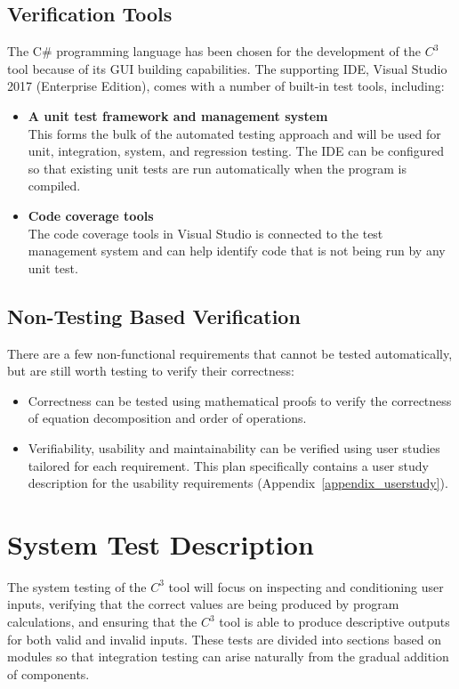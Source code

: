 \documentclass[12pt, titlepage]{article}
\newcommand{\prognameAbbrv}{$C^{3}$}
\begin{document}
\subsection{Verification Tools}
The C\# programming language has been chosen for the development of the 
\prognameAbbrv{} tool because of its GUI building capabilities. The supporting 
IDE, Visual Studio 2017 (Enterprise Edition), comes with a number of built-in 
test tools, including:

\begin{itemize}
	\item \textbf{A unit test framework and management system}\\
	This forms the bulk of the automated testing approach and will be used for 
	unit, integration, system, and regression testing. The IDE can be 
	configured so that existing unit tests are run automatically when the 
	program is compiled.
	\item \textbf{Code coverage tools}\\
	The code coverage tools in Visual Studio is connected to the test 
	management system and can help identify code that is not being run by any 
	unit test. 
\end{itemize}

\subsection{Non-Testing Based Verification}
There are a few non-functional requirements that cannot be tested 
automatically, but are still worth testing to verify their correctness:

\begin{itemize}
	\item Correctness can be tested using mathematical proofs to verify the 
	correctness of equation decomposition and order of operations.
	\item Verifiability, usability and maintainability can be verified using 
	user studies tailored for each requirement. This plan specifically contains 
	a user study description for the usability requirements 
	(Appendix~\ref{appendix_userstudy}).
\end{itemize}

\newpage

\section{System Test Description}
The system testing of the \prognameAbbrv{} tool will focus on inspecting and 
conditioning user inputs, verifying that the correct values are being produced 
by program calculations, and ensuring that the \prognameAbbrv{} tool is able to 
produce descriptive outputs for both valid and invalid inputs. These tests are 
divided into sections based on modules so that integration testing can arise 
naturally from the gradual addition of components. 
\end{document}
